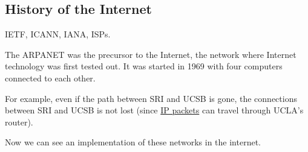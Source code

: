 \documentclass{article}
\newcounter{example}[section]
\begin{document}
  \subsection{History of the Internet}

    IETF, ICANN, IANA, ISPs.  

    \begin{example}[ARPANET]
      \label{ex:arpanet}
      The ARPANET was the precursor to the Internet, the network where Internet technology was first tested out. It was started in 1969 with four computers connected to each other. 

        \begin{center}
        \end{center}

      For example, even if the path between SRI and UCSB is gone, the connections between SRI and UCSB is not lost (since \hyperref[def:ip-packets]{IP packets} can travel through UCLA's router). 
    \end{example}

    Now we can see an implementation of these networks in the internet. 
\end{document}

